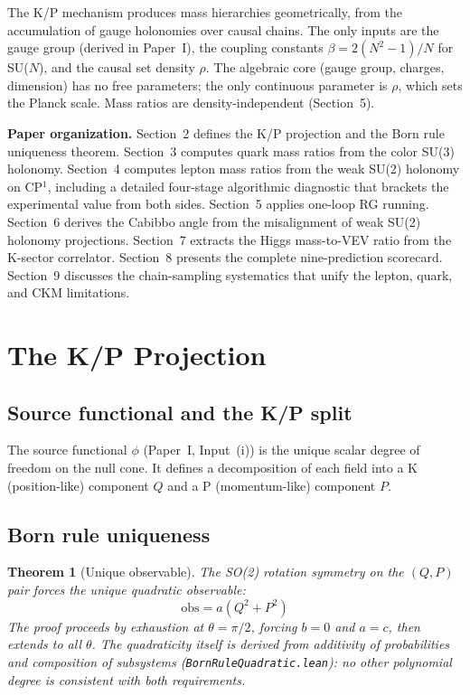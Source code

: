 \documentclass[11pt,letterpaper]{article}
\newtheorem{theorem}{Theorem}
\begin{document}
The K/P mechanism produces mass hierarchies geometrically, from the
accumulation of gauge holonomies over causal chains. The only inputs
are the gauge group (derived in Paper~I), the coupling constants
$\beta = 2(N^2 - 1)/N$ for SU($N$), and the causal set density
$\rho$.  The algebraic core (gauge group, charges, dimension) has
no free parameters; the only continuous parameter is $\rho$, which
sets the Planck scale.  Mass ratios are density-independent
(Section~5).

\medskip
\noindent\textbf{Paper organization.}
Section~2 defines the K/P projection and the Born rule uniqueness
theorem. Section~3 computes quark mass ratios from the color
SU(3) holonomy. Section~4 computes lepton mass ratios from the
weak SU(2) holonomy on CP$^1$, including a detailed four-stage
algorithmic diagnostic that brackets the experimental value from both
sides. Section~5 applies one-loop RG running. Section~6 derives the
Cabibbo angle from the misalignment of weak SU(2) holonomy projections.
Section~7 extracts the Higgs mass-to-VEV ratio from the K-sector
correlator.
Section~8 presents the complete nine-prediction scorecard.
Section~9 discusses the chain-sampling systematics that unify the
lepton, quark, and CKM limitations.

\section{The K/P Projection}

\subsection{Source functional and the K/P split}

The source functional $\phi$ (Paper~I, Input~(i)) is the unique
scalar degree of freedom on the null cone. It defines a decomposition
of each field into a K (position-like) component $Q$ and a P
(momentum-like) component $P$.

\subsection{Born rule uniqueness}

\begin{theorem}[Unique observable]
\label{thm:born}
The SO(2) rotation symmetry on the $(Q, P)$ pair forces the unique
quadratic observable:
\[
  \mathrm{obs} = a(Q^2 + P^2)
\]
The proof proceeds by exhaustion at $\theta = \pi/2$, forcing $b = 0$
and $a = c$, then extends to all $\theta$.  The quadraticity itself
is derived from additivity of probabilities and composition of
subsystems (\texttt{BornRuleQuadratic.lean}): no other polynomial
degree is consistent with both requirements.
\end{theorem}
\end{document}
